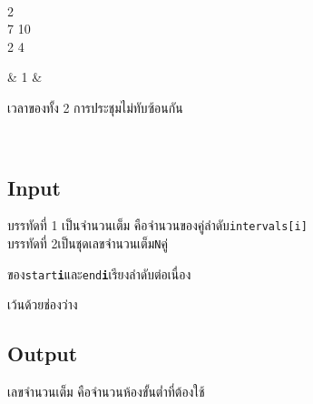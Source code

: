 \documentclass{article}
\begin{document}
{\begin{longtable}[]
\begin{minipage}[t]{\linewidth}
\end{minipage} \\

\begin{minipage}[t]{\linewidth}\raggedright

2\\

7 10\\

2 4\\

\strut

\end{minipage} & 1 & \begin{minipage}[t]{\linewidth}\raggedright

เวลาของทั้ง 2 การประชุมไม่ทับซ้อนกัน\\

\strut

\end{minipage} \\

\end{longtable}

}



\subsection*{Input}
บรรทัดที่ 1 เป็นจำนวนเต็ม คือจำนวนของคู่ลำดับ\texttt{intervals{[}i{]}}\\



บรรทัดที่ 2เป็นชุดเลขจำนวนเต็ม\texttt{N}คู่

ของ\texttt{start}\textbf{\texttt{i}}และ\texttt{end}\textbf{\texttt{i}}เรียงลำดับต่อเนื่อง

เว้นด้วยช่องว่าง\\



\subsection*{Output}
เลขจำนวนเต็ม คือจำนวนห้องขั้นต่ำที่ต้องใช้\\
\end{document}
